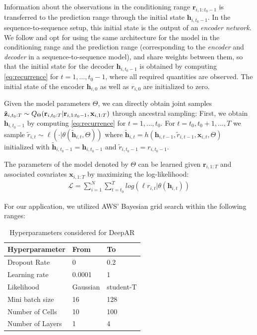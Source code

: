 \documentclass{article}
\newcommand{\rs}[2]{r_{#1, #2}}
\newcommand{\xbf}{\mathbf{x}}
\newcommand{\rVec}[3]{\mathbf{r}_{#1, #2:#3}}
\newcommand{\xVec}[3]{\mathbf{x}_{#1, #2:#3}}
\newcommand{\hVec}{\mathbf{h}}
\begin{document}
Information about the observations in the conditioning range $\rVec{i}{1}{t_0 -1}$ is transferred to the prediction range through the initial state $\hVec_{i, t_0-1}$. In the sequence-to-sequence setup, this initial state is the output of an \emph{encoder network}. We follow \cite{salinas_deepar_2019} and opt for using the same architecture for the model in the conditioning range and the prediction range (corresponding to the \emph{encoder} and \emph{decoder} in a sequence-to-sequence model), and share weights between them, so that the initial state for the decoder $\hVec_{i, t_0 - 1}$ is obtained by computing \eqref{eq:recurrence} for $t = 1, \ldots, t_0 - 1$, where all required quantities are observed. The initial state of the encoder $\hVec_{i, 0}$ as well as $\rs{i}{0}$ are initialized to zero.

Given the model parameters $\Theta$, we can directly obtain joint samples
$\tilde{\mathbf{z}}_{i, t_0:T} \sim \modelDist$ through ancestral sampling:
First, we obtain $\hVec_{i, t_0-1}$ by computing \eqref{eq:recurrence} for $t=1,\ldots, t_0$. For $t=t_0, t_0+1, \ldots, T$ we sample $\tilde{r}_{i, t} \sim \ell(\cdot | \theta(\tilde{\mathbf{h}}_{i,t}, \Theta))$ where $\tilde{\mathbf{h}}_{i, t} = h\left(\hVec_{i, t-1}, \tilde{r}_{i, t-1}, \xbf_{i, t}, \Theta\right)$ initialized with $\tilde{\mathbf{h}}_{i, t_0-1} = \hVec_{i, t_0-1}$ and $\tilde{r}_{i, t_0 -1} = \rs{i}{t_0 - 1}$.

The parameters of the model denoted by $\Theta$ can be learned given $\rVec{i}{1}{T}$ and associated covariates $\xVec{i}{1}{T}$ by maximizing the log-likelihood:
\begin{align}
	\mathcal{L} = \sum_{i = 1}^{N} \sum_{t = t_0}^{T} log(\ell r_{i, t} | \theta(\mathbf{h}_{i, t}))
\end{align}

For our application, we utilized AWS' Bayesian grid search within the following ranges:
\begin{table}[!htb]
	\begin{tabular}{|lll|}
		\hline
		Hyperparameter & From & To \\ \hline
		Dropout Rate & 0 & 0.2\\
		Learning rate & 0.0001 & 1\\
		Likelihood & Gaussian & student-T \\
		Mini batch size & 16 & 128 \\
		Number of Cells & 10 & 100\\
		Number of Layers & 1 & 4 \\ \hline
	\end{tabular}
	\caption{Hyperparameters considered for DeepAR}
\end{table}
\FloatBarrier
\end{document}

